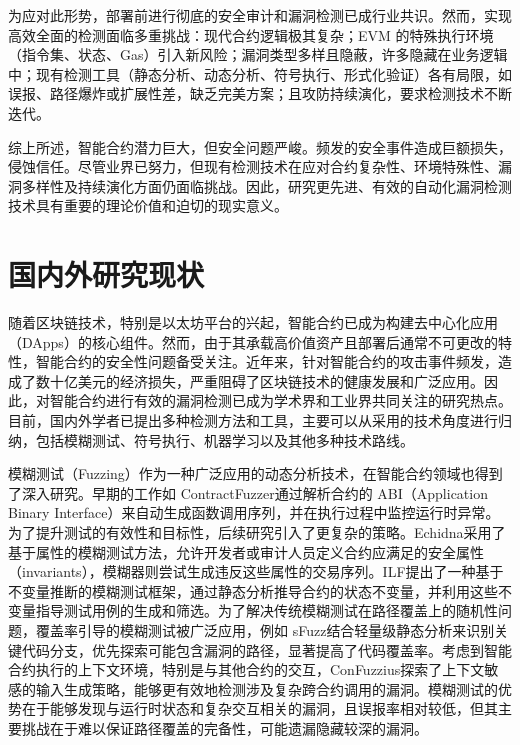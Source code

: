 \documentclass[print, master, vlined, timesmath]{DissertUESTC}
\begin{document}
为应对此形势，部署前进行彻底的安全审计和漏洞检测已成行业共识\cite{}。然而，实现高效全面的检测面临多重挑战：现代合约逻辑极其复杂；EVM 的特殊执行环境（指令集、状态、Gas）引入新风险；漏洞类型多样且隐蔽\cite{}\cite{}，许多隐藏在业务逻辑中；现有检测工具（静态分析、动态分析、符号执行、形式化验证\cite{}）各有局限，如误报、路径爆炸\cite{}或扩展性差，缺乏完美方案；且攻防持续演化，要求检测技术不断迭代。

综上所述，智能合约潜力巨大，但安全问题严峻。频发的安全事件造成巨额损失，侵蚀信任。尽管业界已努力，但现有检测技术在应对合约复杂性、环境特殊性、漏洞多样性及持续演化方面仍面临挑战。因此，研究更先进、有效的自动化漏洞检测技术具有重要的理论价值和迫切的现实意义。


\section{国内外研究现状}

随着区块链技术，特别是以太坊平台的兴起，智能合约已成为构建去中心化应用（DApps）的核心组件。然而，由于其承载高价值资产且部署后通常不可更改的特性，智能合约的安全性问题备受关注。近年来，针对智能合约的攻击事件频发，造成了数十亿美元的经济损失\cite{}，严重阻碍了区块链技术的健康发展和广泛应用。因此，对智能合约进行有效的漏洞检测已成为学术界和工业界共同关注的研究热点。目前，国内外学者已提出多种检测方法和工具，主要可以从采用的技术角度进行归纳，包括模糊测试、符号执行、机器学习以及其他多种技术路线。

模糊测试（Fuzzing）作为一种广泛应用的动态分析技术，在智能合约领域也得到了深入研究。早期的工作如 ContractFuzzer\cite{}通过解析合约的 ABI（Application Binary Interface）来自动生成函数调用序列，并在执行过程中监控运行时异常。为了提升测试的有效性和目标性，后续研究引入了更复杂的策略。Echidna\cite{}采用了基于属性的模糊测试方法，允许开发者或审计人员定义合约应满足的安全属性（invariants），模糊器则尝试生成违反这些属性的交易序列。ILF\cite{}提出了一种基于不变量推断的模糊测试框架，通过静态分析推导合约的状态不变量，并利用这些不变量指导测试用例的生成和筛选。为了解决传统模糊测试在路径覆盖上的随机性问题，覆盖率引导的模糊测试被广泛应用，例如 sFuzz\cite{}结合轻量级静态分析来识别关键代码分支，优先探索可能包含漏洞的路径，显著提高了代码覆盖率。考虑到智能合约执行的上下文环境，特别是与其他合约的交互，ConFuzzius\cite{}探索了上下文敏感的输入生成策略，能够更有效地检测涉及复杂跨合约调用的漏洞。模糊测试的优势在于能够发现与运行时状态和复杂交互相关的漏洞，且误报率相对较低，但其主要挑战在于难以保证路径覆盖的完备性，可能遗漏隐藏较深的漏洞。
\end{document}
